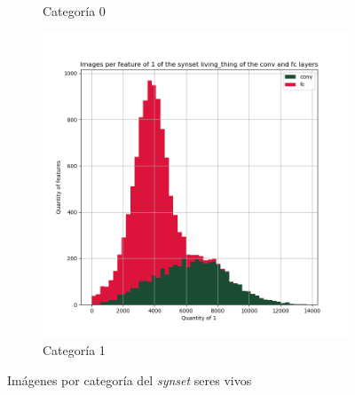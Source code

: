 \documentclass[12,twoside]{TFG-GM}
\theoremstyle{definition}
\theoremstyle{remark}
\begin{document}
\begin{figure}[ht]
\begin{subfigure}[b]{0.3\textwidth}
		\caption{Categoría 0}
	\end{subfigure}
	\begin{subfigure}[b]{0.3\textwidth}
		\includegraphics[width=\textwidth]  {Images/plots/25/synsets/Images_per_feature_of_1_category_living_thingall_layers.png}
		\caption{Categoría 1}
	\end{subfigure}       
	\caption{Imágenes por categoría del \textit{synset} seres vivos \label{fig:imagesperfeatureliving}}
\end{figure}
\end{document}
